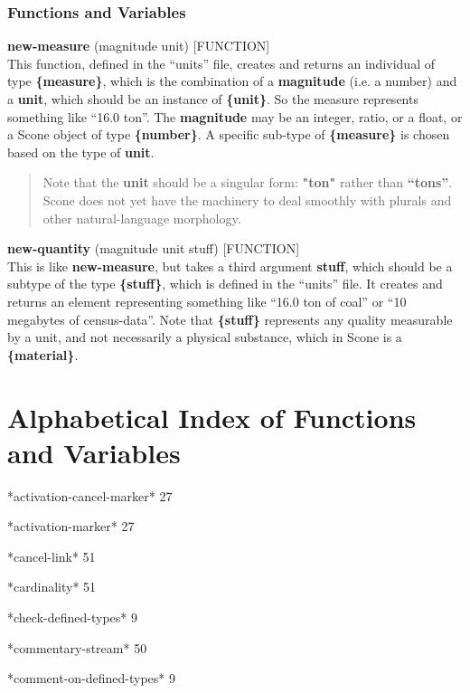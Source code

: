 \documentclass[titlepage,twoside,openright,11pt]{article}
\begin{document}
\subsubsection{Functions and
Variables}\label{functions-and-variables-10}

\textbf{new-measure} (magnitude unit) {[}FUNCTION{]}\\
This function, defined in the ``units'' file, creates and returns an
individual of type \textbf{\{measure\}}, which is the combination of a
\textbf{magnitude} (i.e. a number) and a \textbf{unit}, which should be
an instance of \textbf{\{unit\}}. So the measure represents something
like ``16.0 ton''. The \textbf{magnitude} may be an integer, ratio, or a
float, or a Scone object of type \textbf{\{number\}}. A specific
sub-type of \textbf{\{measure\}} is chosen based on the type of
\textbf{unit}.

\begin{quote}
Note that the \textbf{unit} should be a singular form: \textbf{"ton"}
rather than \textbf{``tons''}. Scone does not yet have the machinery to
deal smoothly with plurals and other natural-language morphology.
\end{quote}

\textbf{new-quantity} (magnitude unit stuff) {[}FUNCTION{]}\\
This is like \textbf{new-measure}, but takes a third argument
\textbf{stuff}, which should be a subtype of the type
\textbf{\{stuff\}}, which is defined in the ``units'' file. It creates
and returns an element representing something like ``16.0 ton of coal''
or ``10 megabytes of census-data''. Note that \textbf{\{stuff\}}
represents any quality measurable by a unit, and not necessarily a
physical substance, which in Scone is a \textbf{\{material\}}.

\section{Alphabetical Index of Functions and
Variables}\label{alphabetical-index-of-functions-and-variables}

*activation-cancel-marker* 27

*activation-marker* 27

*cancel-link* 51

*cardinality* 51

*check-defined-types* 9

*commentary-stream* 50

*comment-on-defined-types* 9
\end{document}
